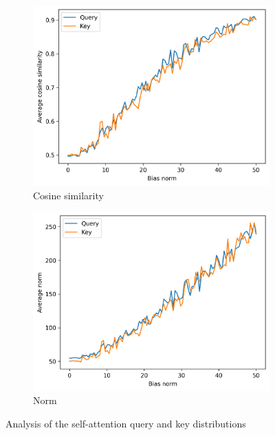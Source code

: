 \begin{figure}[ht]
    \centering
    \begin{subfigure}[b]{0.43\columnwidth}
         \includegraphics[width=\linewidth]{sources/part_1/anisotropy/imgs/trained_bert_base_bias_vs_kq_cos.png}
         \caption{Cosine similarity}
         \label{fig:cos_qk_trained_transformer}
    \end{subfigure}
    \hfill
    \begin{subfigure}[b]{0.43\columnwidth}
         \includegraphics[width=\linewidth]{sources/part_1/anisotropy/imgs/trained_bert_base_bias_vs_kq_norm.png}
         \caption{Norm}
         \label{fig:norm_qk_trained_transformer}
    \end{subfigure}
    \caption{Analysis of the self-attention query and key distributions}
    \label{fig:kq}
\end{figure}

